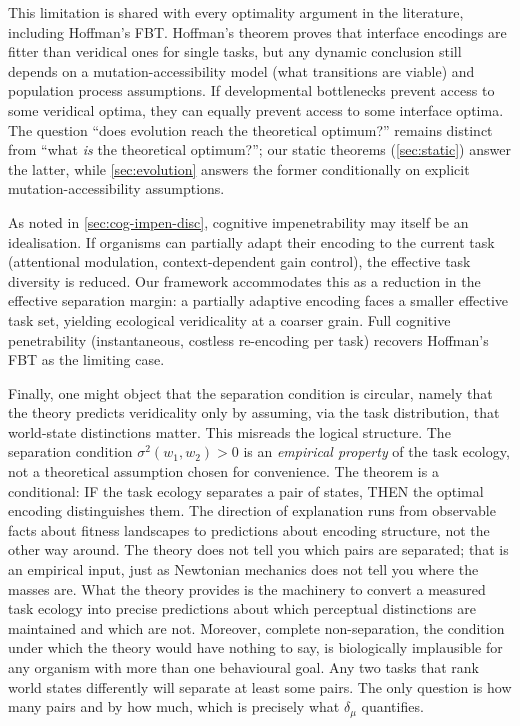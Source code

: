 \documentclass[12pt]{article}
\newcommand{\dmu}{\delta_\mu}
\newcommand{\sigmasq}{\sigma^2}
\begin{document}
This limitation is shared with every optimality argument in the literature, including Hoffman's FBT. Hoffman's theorem proves that interface encodings are fitter than veridical ones for single tasks, but any dynamic conclusion still depends on a mutation-accessibility model (what transitions are viable) and population process assumptions. If developmental bottlenecks prevent access to some veridical optima, they can equally prevent access to some interface optima. The question ``does evolution reach the theoretical optimum?'' remains distinct from ``what \emph{is} the theoretical optimum?''; our static theorems (\cref{sec:static}) answer the latter, while \cref{sec:evolution} answers the former conditionally on explicit mutation-accessibility assumptions.

As noted in \cref{sec:cog-impen-disc}, cognitive impenetrability may itself be an idealisation. If organisms can partially adapt their encoding to the current task (attentional modulation, context-dependent gain control), the effective task diversity is reduced. Our framework accommodates this as a reduction in the effective separation margin: a partially adaptive encoding faces a smaller effective task set, yielding ecological veridicality at a coarser grain. Full cognitive penetrability (instantaneous, costless re-encoding per task) recovers Hoffman's FBT as the limiting case.

Finally, one might object that the separation condition is circular, namely that the theory predicts veridicality only by assuming, via the task distribution, that world-state distinctions matter. This misreads the logical structure. The separation condition $\sigmasq(w_1, w_2) > 0$ is an \emph{empirical property} of the task ecology, not a theoretical assumption chosen for convenience. The theorem is a conditional: IF the task ecology separates a pair of states, THEN the optimal encoding distinguishes them. The direction of explanation runs from observable facts about fitness landscapes to predictions about encoding structure, not the other way around. The theory does not tell you which pairs are separated; that is an empirical input, just as Newtonian mechanics does not tell you where the masses are. What the theory provides is the machinery to convert a measured task ecology into precise predictions about which perceptual distinctions are maintained and which are not. Moreover, complete non-separation, the condition under which the theory would have nothing to say, is biologically implausible for any organism with more than one behavioural goal. Any two tasks that rank world states differently will separate at least some pairs. The only question is how many pairs and by how much, which is precisely what $\dmu$ quantifies.
\end{document}
